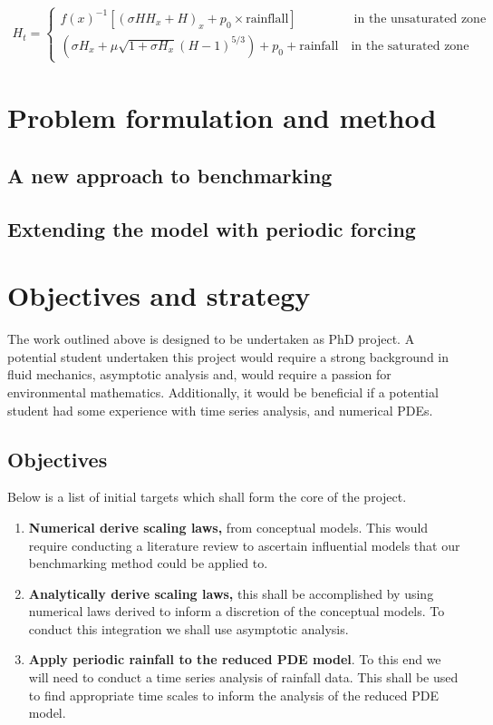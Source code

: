 \documentclass[11pt]{article}
\begin{document}
 \begin{align}
    H_t=\begin{cases}
        f(x)^{-1}[(\sigma HH_x+H)_x+p_0\times\text {rainflall}] \qquad \qquad  \ \; \text{in the unsaturated zone}\\
        (\sigma H_x+\mu\sqrt{1+\sigma H_x}(H-1)^{5/3})+p_0 +\text{rainfall} \quad \text{in the saturated zone}
    \end{cases}
\end{align}




\section{Problem formulation and method}

\subsection{A new approach to benchmarking}


\subsection{Extending the model with periodic forcing}

\section{Objectives and strategy}

The work outlined above is designed to be undertaken as PhD project. A potential student undertaken this project would require a strong background in fluid mechanics, asymptotic analysis and, would require a passion for environmental mathematics. 
Additionally, it would be beneficial if a potential student had some experience with time series analysis, and numerical PDEs.

\subsection{Objectives}
Below is a list of initial targets which shall form the core of the project.

\begin{enumerate}
    \item \textbf{Numerical derive scaling laws,} from conceptual models. This would require conducting a literature review to ascertain influential models that our benchmarking method could be applied to.
    \item \textbf{Analytically derive scaling laws,} this shall be accomplished by using numerical laws derived to inform a discretion of the conceptual models. To conduct this integration we shall use asymptotic analysis.
    \item \textbf{Apply periodic rainfall to the reduced PDE model}. To this end we will need to conduct a time series analysis of rainfall data. This shall be used to find appropriate time scales to inform the analysis of the reduced PDE model.
\end{enumerate}
\end{document}
